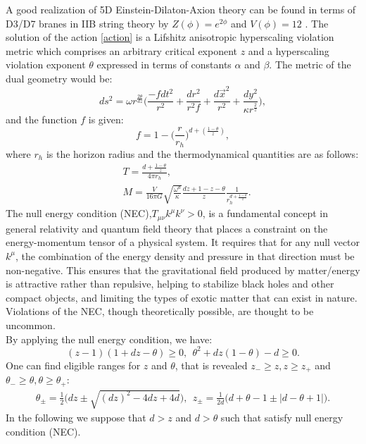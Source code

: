 \documentclass[]{article}
\begin{document}
A good realization of 5D Einstein-Dilaton-Axion theory can be found in terms of  D3/D7 branes in IIB string theory by $Z(\phi)=e^{2\phi}$ and $V(\phi) = 12$ \cite{string}. The solution of the action \eqref{action} is a Lifshitz anisotropic hyperscaling violation metric which comprises an arbitrary critical exponent $z$ and a hyperscaling violation exponent $\theta$ expressed in terms of constants $\alpha$ and $\beta$. The metric of the dual geometry would be:
\begin{equation}
ds^2=\omega r^{\frac{2\theta}{dz}}\Big(\frac{-f dt^2}{r^2}+\frac{dr^2}{r^2f}+\frac{d\vec{x}^2}{r^2}+\frac{dy^2}{\kappa r^{\frac{2}{z}}}\Big), \label{metric}
\end{equation}
and the function $f$ is given:
\begin{equation}
f=1-\Big(\frac{r}{r_h}\Big)^{d+(\frac{1-\theta}{z})},
\end{equation}
where $r_h$ is the horizon radius and the thermodynamical quantities are as follows:
\begin{align}
&T=\frac{d+\frac{1-\theta}{z}}{4\pi r_h} \label{tem},\\
&M=\frac{V}{16\pi G}\sqrt{\frac{\omega^d}{\kappa}}\frac{dz+1-z-\theta}{z}\frac{1}{r_h^{d+\frac{1-\theta}{z}}}. \label{mass}
\end{align}
The null energy condition (NEC),$T_{\mu \nu} k^{\mu} k^{\nu}>0$, is a fundamental concept in general relativity and quantum field theory that places a constraint on the energy-momentum tensor of a physical system. It requires that for any null vector $k^{\mu}$, the combination of the energy density and pressure in that direction must be non-negative. This ensures that the gravitational field produced by matter/energy is attractive rather than repulsive, helping to stabilize black holes and other compact objects, and limiting the types of exotic matter that can exist in nature. Violations of the NEC, though theoretically possible, are thought to be uncommon.\\
By applying the null energy condition, we have:
\begin{equation}
(z-1)(1+dz-\theta)\ge 0,~~\theta ^2+dz(1-\theta)-d \ge 0.
\end{equation}
One can find eligible ranges for $z$ and $\theta$, that is revealed $z_-\ge z,  z\ge z_+$ and $\theta_-\ge \theta, \theta\ge \theta_+$:
\begin{align}
\theta_{\pm}=\frac{1}{2}\Big(dz\pm \sqrt{(dz)^2-4dz+4d}\Big),~~z_{\pm}=\frac{1}{2d}\Big(d+\theta-1\pm |d-\theta+1|\Big).
\end{align}
In the following we suppose that $d>z $ and $d>\theta$ such that satisfy null energy condition (NEC).
\end{document}
